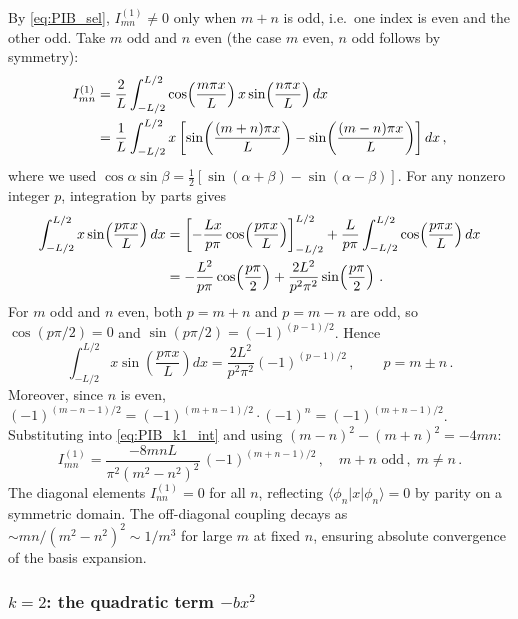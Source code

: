 By \cref{eq:PIB_sel}, $I_{mn}^{(1)} \neq 0$ only when $m + n$ is odd, i.e.\ one
index is even and the other odd.  Take $m$ odd and $n$ even (the case $m$ even,
$n$ odd follows by symmetry):
\begin{align}
  I_{mn}^{(1)}
  &= \frac{2}{L}\int_{-L/2}^{L/2}
    \cos\!\left(\frac{m\pi x}{L}\right)x\sin\!\left(\frac{n\pi x}{L}\right)dx\notag\\
  &= \frac{1}{L}\int_{-L/2}^{L/2}x\left[
    \sin\!\left(\frac{(m+n)\pi x}{L}\right) - \sin\!\left(\frac{(m-n)\pi x}{L}\right)
    \right]dx\,,\label{eq:PIB_k1_int}
\end{align}
where we used $\cos\alpha\sin\beta = \frac{1}{2}[\sin(\alpha+\beta)-\sin(\alpha-\beta)]$.
For any nonzero integer $p$, integration by parts gives
\begin{align}
  \int_{-L/2}^{L/2}x\sin\!\left(\frac{p\pi x}{L}\right)dx
  &= \left[-\frac{Lx}{p\pi}\cos\!\left(\frac{p\pi x}{L}\right)\right]_{-L/2}^{L/2}
    + \frac{L}{p\pi}\int_{-L/2}^{L/2}\cos\!\left(\frac{p\pi x}{L}\right)dx\notag\\
  &= -\frac{L^2}{p\pi}\cos\!\left(\frac{p\pi}{2}\right)
    + \frac{2L^2}{p^2\pi^2}\sin\!\left(\frac{p\pi}{2}\right)\,.
  \label{eq:PIB_k1_ibp}
\end{align}
For $m$ odd and $n$ even, both $p = m+n$ and $p = m-n$ are odd, so
$\cos(p\pi/2) = 0$ and $\sin(p\pi/2) = (-1)^{(p-1)/2}$.  Hence
\begin{equation}
  \int_{-L/2}^{L/2}x\sin\!\left(\frac{p\pi x}{L}\right)dx
  = \frac{2L^2}{p^2\pi^2}(-1)^{(p-1)/2}\,,\qquad p = m\pm n\,.
\end{equation}
Moreover, since $n$ is even, $(-1)^{(m-n-1)/2} = (-1)^{(m+n-1)/2}\cdot(-1)^n
= (-1)^{(m+n-1)/2}$.  Substituting into \cref{eq:PIB_k1_int} and using
$(m-n)^2 - (m+n)^2 = -4mn$:
\begin{equation}\label{eq:PIB_I1}
  \boxed{I_{mn}^{(1)} = \frac{-8mnL}{\pi^2(m^2-n^2)^2}\,(-1)^{(m+n-1)/2}\,,
  \quad m+n\text{ odd}\,,\;m\neq n\,.}
\end{equation}
The diagonal elements $I_{nn}^{(1)} = 0$ for all $n$, reflecting $\langle\phi_n|x|\phi_n\rangle = 0$
by parity on a symmetric domain.  The off-diagonal coupling decays as
$\sim mn/(m^2-n^2)^2 \sim 1/m^3$ for large $m$ at fixed $n$, ensuring absolute
convergence of the basis expansion.

\subsubsection{$k = 2$: the quadratic term $-bx^2$}\label{sec:PIB_k2}

